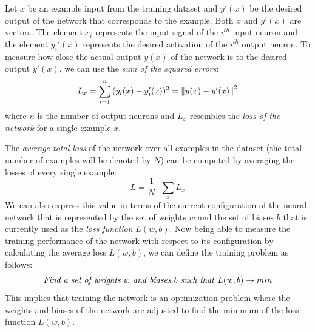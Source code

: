 Let \(x\) be an example input from the training dataset and \(y'(x)\)
be the desired output of the network that corresponds to the
example. Both \(x\) and \(y'(x)\) are vectors. The element \(x_i\) represents the
input signal of the \(i^{th}\) input neuron and the element \(y_i'(x)\)
represents the desired activation of the \(i^{th}\) output neuron. To
measure how close the actual output \(y(x)\) of the network is to the
desired output \(y'(x)\), we can use the \textit{sum of the squared
  errors}:
\begin{equation}
  L_x = \sum_{i=1}^{n}{(y_i(x)-y_i'(x))^2} = \left\lVert y(x)-y'(x)\right\rVert^2
\end{equation}
where \(n\) is the number of output neurons and \(L_x\) resembles the
\textit{loss of the network} for a single example \(x\).

The \textit{average total loss} of the network over all examples in
the dataset (the total number of examples will be denoted by \(N\))
can be computed by averaging the losses of every single example:
\begin{equation}
  \label{eq:loss}
  L = \frac{1}{N} \cdot \sum_{x}{L_x}
\end{equation}
We can also express this value in terms of the current configuration
of the neural network that is represented by the set of weights \(w\)
and the set of biases \(b\) that is currently used as the \textit{loss
function} \(L(w, b)\).
Now being able to measure the training performance of the network with
respect to its configuration by
calculating the average loss \(L(w, b)\), we can define the training
problem as follows:
\begin{equation*}
  \text{\textit{Find a set of weights \(w\) and biases \(b\) such
      that} } L(w, b) \rightarrow min
\end{equation*}
This implies that training the network is an optimization
problem where the weights and biases of the network are
adjusted to find the minimum of the loss function \(L(w, b)\).

